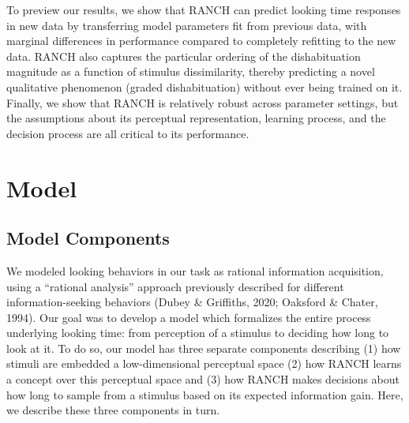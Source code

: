\documentclass[10pt, letterpaper]{article}
\begin{document}
To preview our results, we show that RANCH can predict looking time
responses in new data by transferring model parameters fit from previous
data, with marginal differences in performance compared to completely
refitting to the new data. RANCH also captures the particular ordering
of the dishabituation magnitude as a function of stimulus dissimilarity,
thereby predicting a novel qualitative phenomenon (graded
dishabituation) without ever being trained on it. Finally, we show that
RANCH is relatively robust across parameter settings, but the
assumptions about its perceptual representation, learning process, and
the decision process are all critical to its performance.

\hypertarget{model}{%
\section{Model}\label{model}}

\hypertarget{model-components}{%
\subsection{Model Components}\label{model-components}}

We modeled looking behaviors in our task as rational information
acquisition, using a ``rational analysis'' approach previously described
for different information-seeking behaviors (Dubey \& Griffiths, 2020;
Oaksford \& Chater, 1994). Our goal was to develop a model which
formalizes the entire process underlying looking time: from perception
of a stimulus to deciding how long to look at it. To do so, our model
has three separate components describing (1) how stimuli are embedded a
low-dimensional perceptual space (2) how RANCH learns a concept over
this perceptual space and (3) how RANCH makes decisions about how long
to sample from a stimulus based on its expected information gain. Here,
we describe these three components in turn.
\end{document}
